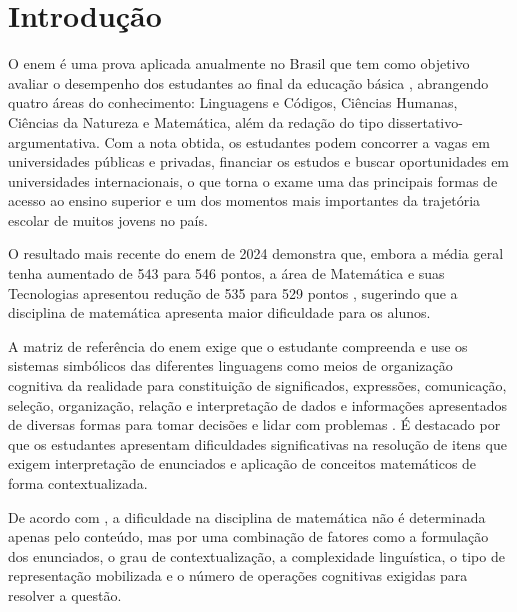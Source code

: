 
\chapter{Introdução}
\label{ch:introducao}

\setlength{\parskip}{0.3cm}

O \gls{enem} é uma prova aplicada anualmente no
Brasil que tem como objetivo avaliar o desempenho dos estudantes ao final da
educação básica \cite{brasil2026enem}, abrangendo quatro áreas do conhecimento: 
Linguagens e Códigos, Ciências Humanas, Ciências da Natureza e Matemática, além
da redação do tipo dissertativo-argumentativa. Com a nota obtida, os estudantes
podem concorrer a vagas em universidades públicas e privadas, financiar os
estudos e buscar oportunidades em universidades internacionais, o que torna o
exame uma das principais formas de acesso ao ensino superior e um dos
momentos mais importantes da trajetória escolar de muitos jovens no país.

O resultado mais recente do \gls{enem} de 2024
demonstra que, embora a média geral tenha aumentado de 543 para 546 pontos, a área de
Matemática e suas Tecnologias apresentou redução de 535 para 529 pontos
\cite{inep2025enem}, sugerindo que a disciplina de matemática apresenta maior
dificuldade para os alunos.

A matriz de referência do \gls{enem} exige que o estudante compreenda e use os
sistemas simbólicos das diferentes linguagens como meios de organização
cognitiva da realidade para constituição de significados, expressões,
comunicação, seleção, organização, relação e interpretação de dados
e informações apresentados de diversas formas para tomar decisões e lidar com
problemas \cite{matriz_enem}. É destacado por  que os
estudantes apresentam dificuldades significativas na resolução de itens que
exigem interpretação de enunciados e aplicação de conceitos matemáticos de forma
contextualizada.

De acordo com , a dificuldade na disciplina de matemática 
não é determinada apenas pelo conteúdo, mas por uma combinação de fatores como a
formulação dos enunciados, o grau de contextualização, a complexidade
linguística, o tipo de representação mobilizada e o número de operações
cognitivas exigidas para resolver a questão.
\newpage{}

